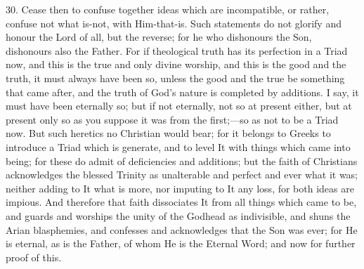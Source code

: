 30. Cease then to confuse
together ideas which are incompatible, or rather, confuse not what
is-not, with Him-that-is. Such statements do not glorify and honour
the Lord of all, but the reverse; for he who dishonours the Son,
dishonours also the Father. For if theological truth has its
perfection in a Triad now, and this is the true and only divine
worship, and this is the good and the truth, it must always have been
so, unless the good and the true be something that came after, and the
truth of God's nature is completed by additions. I say, it must have
been eternally so; but if not eternally, not so at present either, but
at present only so as you suppose it was from the first;—so as not
to be a Triad now. But such heretics no Christian would bear; for it
belongs to Greeks to introduce a Triad which is generate, and to level
It with things which came into being; for these do admit of
deficiencies and additions; but the faith of Christians acknowledges
the blessed Trinity as unalterable and perfect and ever what it was;
neither adding to It what is more, nor imputing to It any loss, for
both ideas are impious. And therefore that faith dissociates It from
all things which came to be, and guards and worships the unity
of the Godhead as indivisible, and shuns the Arian blasphemies, and
confesses and acknowledges that the Son was ever; for He is eternal,
as is the Father, of whom He is the Eternal Word; and now for further
proof of this.

